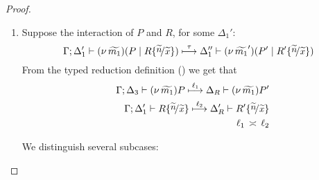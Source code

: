 \begin{proof}
\begin{enumerate}
		\item	Suppose the interaction of $P$ and $R$, for some $\Delta_1'$:
		\[
					\horel{\Gamma}{\Delta_1'}{\newsp{\widetilde{m_1}}{P \Par R \subst{\widetilde{n}}{\widetilde{x}} }}
					{\hby{\tau}}
					{\Delta_1''}{\newsp{\widetilde{m_1}'}{P' \Par R' \subst{\widetilde{n}}{\widetilde{x}} }}
				\]
				From the typed reduction definition () we get that
				\begin{eqnarray}
					&&	\horel{\Gamma}{\Delta_3}{\news{\widetilde{m_1}}{P}}
						{\hby{\ell_1}}
						{\Delta_R}{\news{\widetilde{m_1}}{P'}}
					\label{lem:trigger_subst_31}
					\\
					&&	\horel{\Gamma}{\Delta_1'}{R \subst{\widetilde{n}}{\widetilde{x}} }
						{\hby{\ell_2}}
						{\Delta_R'}{R' \subst{\widetilde{n}}{\widetilde{x}} }
					\label{lem:trigger_subst_32}
					\\
					&&	\ell_1 \comp \ell_2 \nonumber
				\end{eqnarray}

				We distinguish several subcases:
				\begin{enumerate}[i.]
	

\end{enumerate}
\end{enumerate}
\end{proof}
